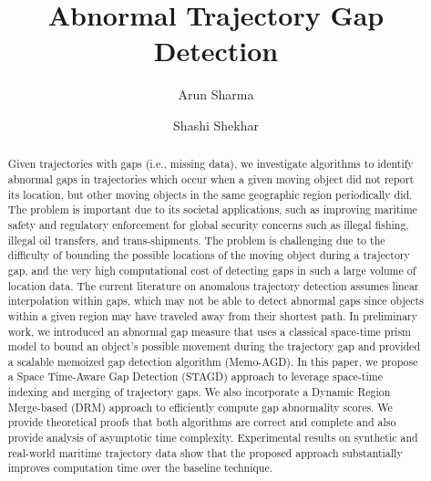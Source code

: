 \documentclass[acmsmall]{acmart}
\begin{document}
\title{Abnormal Trajectory Gap Detection}



\author{Arun Sharma}

\author{Shashi Shekhar}

\renewcommand{\shortauthors}{Arun Sharma and Shashi Shekhar}

\begin{abstract}
Given trajectories with gaps (i.e., missing data), we investigate algorithms to identify abnormal gaps in trajectories which occur when a given moving object did not report its location, but other moving objects in the same geographic region periodically did. The problem is important due to its societal applications, such as improving maritime safety and regulatory enforcement for global security concerns such as illegal fishing, illegal oil transfers, and trans-shipments. The problem is challenging due to the difficulty of bounding the possible locations of the moving object during a trajectory gap, and the very high computational cost of detecting gaps in such a large volume of location data. The current literature on anomalous trajectory detection assumes linear interpolation within gaps, which may not be able to detect abnormal gaps since objects within a given region may have traveled away from their shortest path. In preliminary work, we introduced an abnormal gap measure that uses a classical space-time prism model to bound an object's possible movement during the trajectory gap and provided a scalable memoized gap detection algorithm (Memo-AGD). In this paper, we propose a Space Time-Aware Gap Detection (STAGD) approach to leverage space-time indexing and merging of trajectory gaps. We also incorporate a Dynamic Region Merge-based (DRM) approach to efficiently compute gap abnormality scores. We provide theoretical proofs that both algorithms are correct and complete and also provide analysis of asymptotic time complexity. Experimental results on synthetic and real-world maritime trajectory data show that the proposed approach substantially improves computation time over the baseline technique.
\end{abstract}
\end{document}
